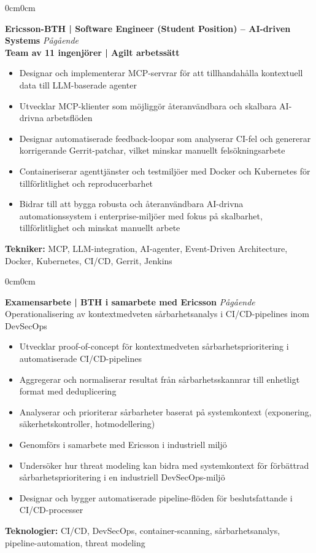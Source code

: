 \documentclass[10pt, letterpaper]{article}
\newenvironment{highlights}{
    \begin{itemize}[topsep=0.10cm, parsep=0.10cm, partopsep=0pt, itemsep=0pt, leftmargin=10pt]
}{
    \end{itemize}
}
\newenvironment{onecolentry}{
    \begin{adjustwidth}{0cm}{0cm}
}{
    \end{adjustwidth}
}
\begin{document}
    \begin{onecolentry}
        \textbf{Ericsson-BTH | Software Engineer (Student Position) -- AI-driven Systems} \hfill \textit{Pågående}
        \\[0.15cm]
        \textbf{Team av 11 ingenjörer | Agilt arbetssätt}
        \begin{highlights}
            \item Designar och implementerar MCP-servrar för att tillhandahålla kontextuell data till LLM-baserade agenter
            \item Utvecklar MCP-klienter som möjliggör återanvändbara och skalbara AI-drivna arbetsflöden
            \item Designar automatiserade feedback-loopar som analyserar CI-fel och genererar korrigerande Gerrit-patchar, vilket minskar manuellt felsökningsarbete
            \item Containeriserar agenttjänster och testmiljöer med Docker och Kubernetes för tillförlitlighet och reproducerbarhet
            \item Bidrar till att bygga robusta och återanvändbara AI-drivna automationssystem i enterprise-miljöer med fokus på skalbarhet, tillförlitlighet och minskat manuellt arbete
        \end{highlights}
        \textbf{Tekniker:} MCP, LLM-integration, AI-agenter, Event-Driven Architecture, Docker, Kubernetes, CI/CD, Gerrit, Jenkins
    \end{onecolentry}

    \vspace{0.3cm}

    \begin{onecolentry}
        \textbf{Examensarbete | BTH i samarbete med Ericsson} \hfill \textit{Pågående} \\
        Operationalisering av kontextmedveten sårbarhetsanalys i CI/CD-pipelines inom DevSecOps
        \begin{highlights}
            \item Utvecklar proof-of-concept för kontextmedveten sårbarhetsprioritering i automatiserade CI/CD-pipelines
            \item Aggregerar och normaliserar resultat från sårbarhetsskannrar till enhetligt format med deduplicering
            \item Analyserar och prioriterar sårbarheter baserat på systemkontext (exponering, säkerhetskontroller, hotmodellering)
            \item Genomförs i samarbete med Ericsson i industriell miljö
            \item Undersöker hur threat modeling kan bidra med systemkontext för förbättrad sårbarhetsprioritering i en industriell DevSecOps-miljö
            \item Designar och bygger automatiserade pipeline-flöden för beslutsfattande i CI/CD-processer
        \end{highlights}
        \textbf{Teknologier:} CI/CD, DevSecOps, container-scanning, sårbarhetsanalys, pipeline-automation, threat modeling
    \end{onecolentry}
\end{document}
